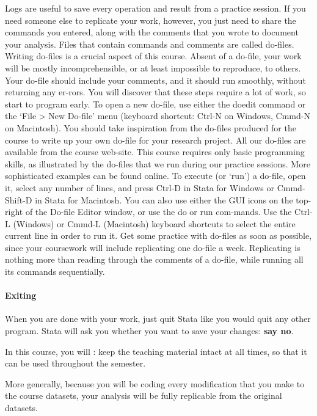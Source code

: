 Logs are useful to save every operation and result from a practice session. If you need someone else to replicate your work, however, you just need to share the commands you entered, along with the comments that you wrote to document your analysis. Files that contain commands and comments are called do-files.
Writing do-files is a crucial aspect of this course. Absent of a do-file, your work will be mostly incomprehensible, or at least impossible to reproduce, to others. Your do-file should include your comments, and it should run smoothly, without returning any er-rors. You will discover that these steps require a lot of work, so start to program early. To open a new do-file, use either the doedit command or the ‘File > New Do-file’ menu (keyboard shortcut: Ctrl-N on Windows, Cmmd-N on Macintosh).
You should take inspiration from the do-files produced for the course to write up your own do-file for your research project. All our do-files are available from the course web-site. This course requires only basic programming skills, as illustrated by the do-files that we run during our practice sessions. More sophisticated examples can be found online.
To execute (or ‘run’) a do-file, open it, select any number of lines, and press Ctrl-D in Stata for Windows or Cmmd-Shift-D in Stata for Macintosh. You can also use either the GUI icons on the top-right of the Do-file Editor window, or use the do or run com-mands. Use the Ctrl-L (Windows) or Cmmd-L (Macintosh) keyboard shortcuts to select the entire current line in order to run it.
Get some practice with do-files as soon as possible, since your coursework will include replicating one do-file a week. Replicating is nothing more than reading through the comments of a do-file, while running all its commands sequentially.


\paragraph{Exiting}

When you are done with your work, just quit Stata like you would quit any other program. Stata will ask you whether you want to save your changes: \textbf{say no}.%

In this course, you will : keep the teaching material intact at all times, so that it can be used throughout the semester.%

More generally, because you will be coding every modification that you make to the course datasets, your analysis will be fully replicable from the original datasets.%

